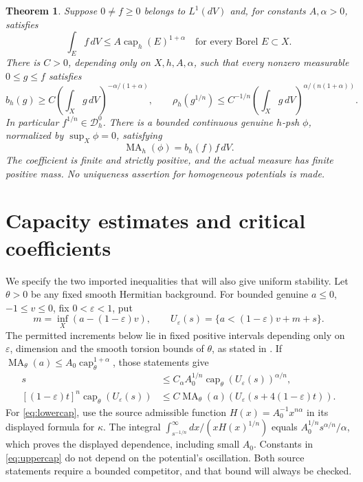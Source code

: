 \documentclass[11pt]{article}
\newcommand{\MA}{\operatorname{MA}}
\newcommand{\capH}{\operatorname{cap}}
\newcommand{\Dzero}{\mathcal D_h^0}
\newtheorem{theorem}{Theorem}
\theoremstyle{remark}\newtheorem{remark}[theorem]{Remark}
\begin{document}
\begin{theorem}\label{th:main}
Suppose $0\ne f\geq0$ belongs to $L^1(dV)$ and, for constants
$A,\alpha>0$, satisfies
\begin{equation}\label{eq:power}
 \int_E f\,dV\leq A\capH_h(E)^{1+\alpha}
 \quad\text{for every Borel }E\subset X.
\end{equation}
There is $C>0$, depending only on $X,h,A,\alpha$, such that every
nonzero measurable $0\leq g\leq f$ satisfies
\begin{equation}\label{eq:critical}
 b_h(g)\geq C\left(\int_Xg\,dV\right)^{-\alpha/(1+\alpha)},
 \qquad
 \rho_h(g^{1/n})\leq C^{-1/n}
       \left(\int_Xg\,dV\right)^{\alpha/(n(1+\alpha))}.
\end{equation}
In particular $f^{1/n}\in\Dzero$. There is a bounded continuous
genuine $h$-psh $\phi$, normalized by $\sup_X\phi=0$, satisfying
\begin{equation}\label{eq:exact}
 \MA_h(\phi)=b_h(f)f\,dV.
\end{equation}
The coefficient is finite and strictly positive, and the actual measure
has finite positive mass. No uniqueness assertion for homogeneous
potentials is made.
\end{theorem}

\section{Capacity estimates and critical coefficients}
We specify the two imported inequalities that will also give uniform
stability. Let $\theta>0$ be any fixed smooth Hermitian background.
For bounded genuine $a\leq0$, $-1\leq v\leq0$, fix $0<\varepsilon<1$,
put
\[
 m=\inf_X(a-(1-\varepsilon)v),\qquad
 U_\varepsilon(s)=\{a<(1-\varepsilon)v+m+s\}.
\]
The permitted increments below lie in fixed positive intervals depending
only on $\varepsilon$, dimension and the smooth torsion bounds of
$\theta$, as stated in \cite[Theorem 5.3 and Lemma 5.4]{KN}.
If $\MA_\theta(a)\leq A_0\capH_\theta^{1+\alpha}$, those statements give
\begin{align}
 s&\leq C_\alpha A_0^{1/n}
                 \capH_\theta(U_\varepsilon(s))^{\alpha/n},
                 \label{eq:lowercap}\\
 [(1-\varepsilon)t]^n\capH_\theta(U_\varepsilon(s))
  &\leq C\MA_\theta(a)
          (U_\varepsilon(s+4(1-\varepsilon)t)).\label{eq:uppercap}
\end{align}
For \eqref{eq:lowercap}, use the source admissible function
$H(x)=A_0^{-1}x^{n\alpha}$ in its displayed formula for $\kappa$.
The integral $\int_{s^{-1/n}}^\infty dx/(xH(x)^{1/n})$
equals $A_0^{1/n}s^{\alpha/n}/\alpha$, which proves the displayed
dependence, including small $A_0$. Constants in
\eqref{eq:uppercap} do not depend on the potential's oscillation.
Both source statements require a bounded competitor, and that bound
will always be checked.
\end{document}
